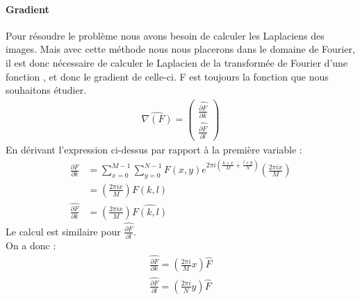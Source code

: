 \paragraph{Gradient}
Pour résoudre le problème nous avons besoin de calculer les Laplaciens des images. Mais avec cette méthode nous nous placerons dans le domaine de Fourier, il est donc nécessaire de calculer le Laplacien de la transformée de Fourier d'une fonction , et donc le gradient de celle-ci. 
F est toujours la fonction que nous souhaitons étudier. 
\begin{equation}
\begin{aligned}
\widehat{\nabla (F)}=
\begin{pmatrix}
\widehat{\frac{\partial F}{\partial k}}\\
\widehat{\frac{\partial F}{\partial l}}
\end{pmatrix}
\end{aligned}
\end{equation}
En dérivant l'expression ci-dessus par rapport à la première variable : 
\begin{equation}
\begin{aligned}
\frac{\partial F}{\partial k} &= \sum_{x = 0}^{M-1} \sum_{y = 0}^{N-1} F(x,y) e^{2\pi i\left(\frac{k\times x}{M}+\frac{l\times y}{N}\right)}\left(\frac{2\pi i x}{M}\right)\\
& = \left(\frac{2\pi i x}{M}\right)F(k,l)\\
\widehat{\frac{\partial F}{\partial k}} &= \left(\frac{2\pi i x}{M}\right)\widehat{F(k,l)}
\end{aligned}
\end{equation}
Le calcul est similaire pour $\widehat{\frac{\partial F}{\partial l}}$.\\
On a donc : 
\begin{equation}
\begin{aligned}
\widehat{\frac{\partial F}{\partial k}} = \left(\frac{2\pi i}{M}x\right) \widehat{F}\\
\widehat{\frac{\partial F}{\partial l}} = \left(\frac{2\pi i}{N}y\right) \widehat{F}\\
\end{aligned}
\end{equation}

